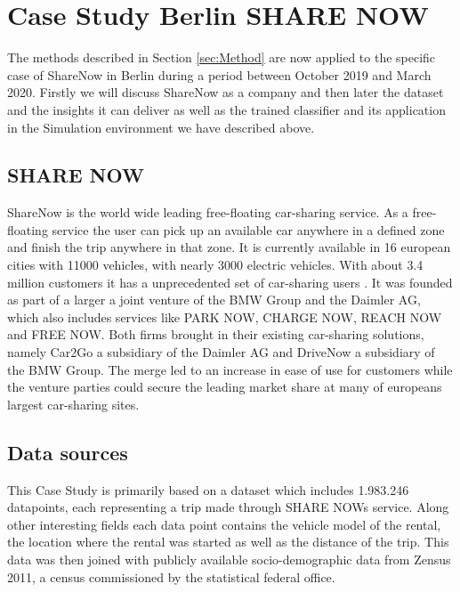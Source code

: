 \clearpage
\section{Case Study Berlin SHARE NOW}
\label{sec:CaseStudy}

The methods described in Section \ref{sec:Method} are now applied to the specific case
of ShareNow in Berlin during a period between October 2019 and March 2020. Firstly
we will discuss ShareNow as a company and then later the dataset and the insights it
can deliver as well as the trained classifier and its application in the Simulation
environment we have described above. 

\subsection{SHARE NOW}

ShareNow is the world wide leading free-floating car-sharing service.
As a free-floating service the user can pick up an available car anywhere in a defined zone
and finish the trip anywhere in that zone. It is currently available in 16 european cities
with 11000 vehicles, with nearly 3000 electric vehicles. With about 3.4 million customers
it has a unprecedented set of car-sharing users \cite{ShareNowAboutUs}. It was founded as 
part of a larger a joint venture of the BMW Group and the Daimler AG, which also includes
services like PARK NOW, CHARGE NOW, REACH NOW and FREE NOW. Both firms brought in their
existing car-sharing solutions, namely Car2Go a subsidiary of the Daimler AG and DriveNow
a subsidiary of the BMW Group. The merge led to an increase in ease of use for customers
while the venture parties could secure the leading market share at many of europeans
largest car-sharing sites.


\subsection{Data sources}
\label{sub_sec:CaseStudy/Data}

This Case Study is primarily based on a dataset which includes 1.983.246 datapoints, each 
representing a trip made through SHARE NOWs service. Along other interesting fields each data point
contains the vehicle model of the rental, the location where the rental was started as well as the distance of the trip.
This data was then joined with publicly available socio-demographic data from Zensus 2011, a census
commissioned by the statistical federal office. 


